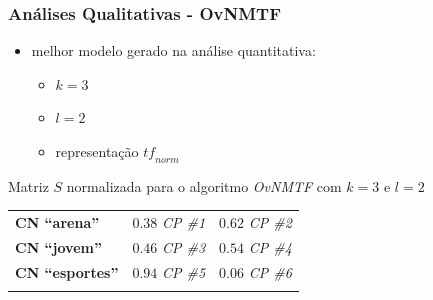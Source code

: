 \documentclass[10pt]{beamer}
\begin{document}
\begin{frame}
\frametitle{Análises Qualitativas - OvNMTF}

  \begin{itemize}
    \item melhor modelo gerado na análise quantitativa:
    \begin{itemize}
      \item $k = 3$
      \item $l = 2$
      \item representação $\textit{tf}_{norm}$
    \end{itemize}
  \end{itemize}

  Matriz $S$ normalizada para o algoritmo \textit{OvNMTF} com $k = 3$ e $l = 2$
  \begin{table}[H]
    \centering
        \begin{tabular}{lcc}
            \hline
            &  &  \\
            \hline
            \textbf{CN ``arena''}    & $\mathbf{0.38}$ \textit{CP \#1} & $\mathbf{0.62}$ \textit{CP \#2} \\
            \textbf{CN ``jovem''}    & $\mathbf{0.46}$ \textit{CP \#3} & $\mathbf{0.54}$ \textit{CP \#4} \\
            \textbf{CN ``esportes''} & $\mathbf{0.94}$ \textit{CP \#5} & $0.06$ \textit{CP \#6} \\
            \hline \\
        \end{tabular}
    \end{table}

\end{frame}

\end{document}
